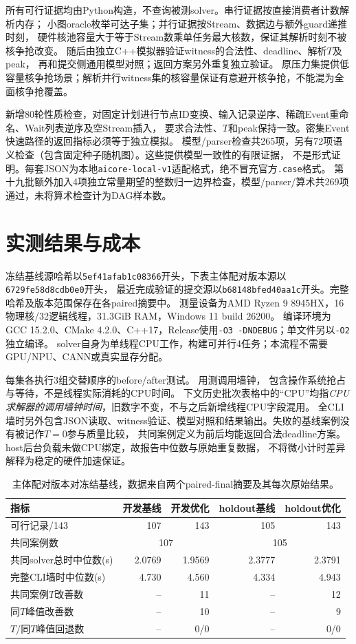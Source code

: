 \documentclass[UTF8,a4paper,11pt,fontset=fandol]{ctexart}
\begin{document}
所有可行证据均由Python构造，不查询被测solver。串行证据按直接消费者计数解析内存；
小图oracle枚举可达子集；并行证据按Stream、数据边与额外guard递推时刻，
硬件核池容量大于等于Stream数乘单任务最大核数，保证其解析时刻不被核争抢改变。
随后由独立C++模拟器验证witness的合法性、deadline、解析$T$及peak，
再和提交侧通用模型对照；返回方案另外重复独立验证。
原压力集提供低容量核争抢场景；解析并行witness集的核容量保证有意避开核争抢，不能混为全面核争抢覆盖。

新增80轮性质检查，对固定计划进行节点ID变换、输入记录逆序、稀疏Event重命名、Wait列表逆序及空Stream插入，
要求合法性、$T$和peak保持一致。密集Event快速路径的返回指标必须等于独立模拟。
模型/parser检查共265项，另有72项语义检查（包含固定种子随机图）。这些提供模型一致性的有限证据，
不是形式证明。每套JSON为本地\texttt{aicore-local-v1}适配格式，绝不冒充官方\texttt{.case}格式。
第十九批额外加入4项独立常量期望的整数归一边界检查，模型/parser/算术共269项通过，未将算术检查计为DAG样本数。

\section{实测结果与成本}
冻结基线源哈希以\texttt{5ef41afab1c08366}开头，下表主体配对版本源以\texttt{6729fe58d8cdb0e0}开头，
最近完成验证的提交源以\texttt{b68148bfed40aa1c}开头。完整哈希及版本范围保存在各paired摘要中。
测量设备为AMD Ryzen 9 8945HX，16物理核/32逻辑线程，31.3GiB RAM，Windows 11 build 26200。
编译环境为GCC 15.2.0、CMake 4.2.0、C++17，Release使用\texttt{-O3 -DNDEBUG}；单文件另以\texttt{-O2}独立编译。
solver自身为单线程CPU工作，构建可并行4任务；本流程不需要GPU/NPU、CANN或真实显存分配。

每集各执行3组交替顺序的before/after测试。
用测调用墙钟，
包含操作系统抢占与等待，不是线程实际消耗的CPU时间。
下文历史批次表格中的``CPU''均指\emph{CPU求解器的调用墙钟时间}，旧数字不变，不与之后新增线程CPU字段混用。
全CLI墙时另外包含JSON读取、witness验证、模型对照和结果输出。失败的基线案例没有被记作$T=0$参与质量比较，
共同案例定义为前后均能返回合法deadline方案。host后台负载未做CPU绑定，故报告中位数与原始重复数据，
不将微小计时差异解释为稳定的硬件加速保证。

\begin{table}[ht]
\centering\small
\begin{tabular}{lrrrr}
\toprule
指标 & 开发基线 & 开发优化 & holdout基线 & holdout优化\\
\midrule
可行记录/143 & 107 & 143 & 105 & 143\\
共同案例数 & \multicolumn{2}{c}{107} & \multicolumn{2}{c}{105}\\
共同solver总时中位数(s) & 2.0769 & 1.9569 & 2.3777 & 2.3791\\
完整CLI墙时中位数(s) & 4.730 & 4.560 & 4.334 & 4.943\\
共同案例$T$改善数 & -- & 11 & -- & 12\\
同$T$峰值改善数 & -- & 10 & -- & 9\\
$T$/同$T$峰值回退数 & -- & 0/0 & -- & 0/0\\
\bottomrule
\end{tabular}
\caption{主体配对版本对冻结基线，数据来自两个paired-final摘要及其每次原始结果。}
\end{table}
\end{document}
